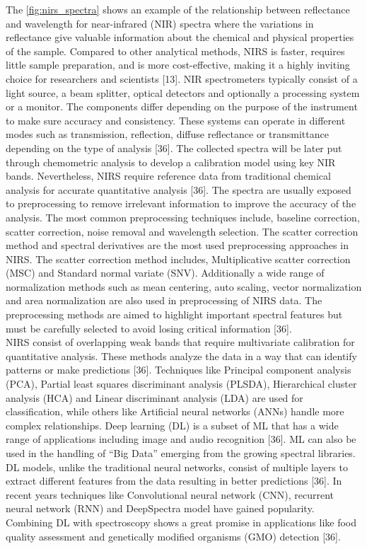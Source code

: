 \documentclass[12pt,a4paper]{report}
\begin{document}
The \ref{fig:nirs_spectra} shows an example of the relationship between reflectance and wavelength for
near-infrared (NIR) spectra where the variations in reflectance give valuable information
about the chemical and physical properties of the sample. Compared to other analytical methods, NIRS is faster, requires little sample preparation, and is more cost-effective, making it a
highly inviting choice for researchers and scientists [13]. NIR spectrometers typically consist
of a light source, a beam splitter, optical detectors and optionally a processing system or a
monitor. The components differ depending on the purpose of the instrument to make sure accuracy
and consistency. These systems can operate in different modes such as transmission, reflection,
diffuse reflectance or transmittance depending on the type of analysis [36]. The collected spectra
will be later put through chemometric analysis to develop a calibration model using key NIR
bands. Nevertheless, NIRS require reference data from traditional chemical analysis for accurate
quantitative analysis [36]. The spectra are usually exposed to preprocessing to remove irrelevant information to improve the accuracy of the analysis. The most common preprocessing techniques
include, baseline correction, scatter correction, noise removal and wavelength selection. The
scatter correction method and spectral derivatives are the most used preprocessing approaches
in NIRS. The scatter correction method includes, Multiplicative scatter correction (MSC) and
Standard normal variate (SNV). Additionally a wide range of normalization methods such as
mean centering, auto scaling, vector normalization and area normalization are also used in preprocessing of NIRS data. The preprocessing methods are aimed to highlight important spectral
features but must be carefully selected to avoid losing critical information [36]. \\

NIRS consist of overlapping weak bands that require multivariate calibration for quantitative analysis. These methods analyze the data in a way that can identify patterns or make predictions [36]. Techniques like Principal component analysis (PCA), Partial least squares discriminant analysis (PLSDA), Hierarchical cluster analysis (HCA) and Linear discriminant analysis (LDA) are used for classification, while others like Artificial neural networks (ANNs) handle more complex relationships. 
Deep learning (DL) is a subset of ML that has a wide range of applications including image and audio recognition [36]. ML can also be used in the handling of “Big Data” emerging from the growing spectral libraries. DL models, unlike the traditional neural networks, consist of multiple layers to extract different features from the data resulting in better predictions [36]. In recent years techniques like Convolutional neural network (CNN), recurrent neural network (RNN) and DeepSpectra 
model have gained popularity. Combining DL with spectroscopy shows a great promise in applications like food quality assessment and genetically modified organisms (GMO) detection [36].\\
\end{document}
